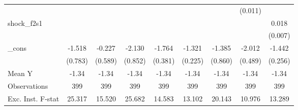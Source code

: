 {\begin{tabular}{l*{8}{c}}
            &                     &                     &                     &                     &                     &                     &     (0.011)         &                     \\
\addlinespace
shock\_f2s1  &                     &                     &                     &                     &                     &                     &                     &       0.018\sym{**} \\
            &                     &                     &                     &                     &                     &                     &                     &     (0.007)         \\
\addlinespace
\_cons      &      -1.518\sym{*}  &      -0.227         &      -2.130\sym{**} &      -1.764\sym{***}&      -1.321\sym{***}&      -1.385         &      -2.012\sym{***}&      -1.442\sym{***}\\
            &     (0.783)         &     (0.589)         &     (0.852)         &     (0.381)         &     (0.225)         &     (0.860)         &     (0.489)         &     (0.256)         \\
\midrule
Mean Y      &       -1.34         &       -1.34         &       -1.34         &       -1.34         &       -1.34         &       -1.34         &       -1.34         &       -1.34         \\
Observations&         399         &         399         &         399         &         399         &         399         &         399         &         399         &         399         \\
Exc. Inst. F-stat&      25.317         &      15.520         &      25.682         &      14.583         &      13.102         &      20.143         &      10.976         &      13.289         \\
\bottomrule
\end{tabular}
}
